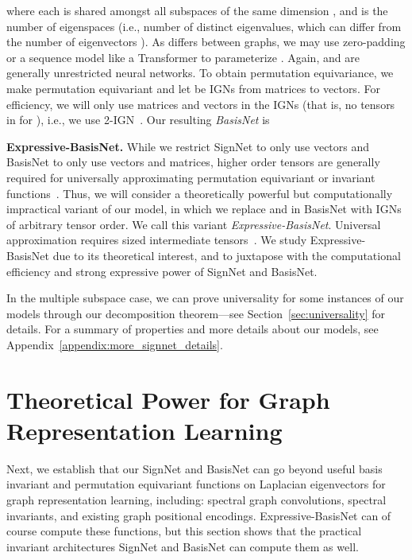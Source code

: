 \documentclass{article} \usepackage{iclr2023_conference,times}
\begin{document}
where each  is shared amongst all subspaces of the same dimension , and  is the number of eigenspaces (i.e., number of distinct eigenvalues, which can differ from the number of eigenvectors ). As  differs between graphs, we may use zero-padding or a sequence model like a Transformer to parameterize . Again,  and  are generally unrestricted neural networks. To obtain permutation equivariance, we make  permutation equivariant and let  be IGNs from matrices to vectors. For efficiency, we will only use matrices and vectors in the IGNs (that is, no tensors in  for ), i.e., we use 2-IGN~\citep{maron2018invariant}. Our resulting \textit{BasisNet} is

\textbf{Expressive-BasisNet.} While we restrict SignNet to only use vectors and BasisNet to only use vectors and matrices,  higher order tensors are generally required for universally approximating permutation equivariant or invariant functions~\citep{keriven2019universal,maron2019universality,maehara2019simple}. Thus, we will consider a theoretically powerful but computationally impractical variant of our model, in which we replace  and  in BasisNet with IGNs of arbitrary tensor order. We call this variant \textit{Expressive-BasisNet}. Universal approximation requires  sized intermediate tensors~\citep{ravanbakhsh2020universal}. 
We study Expressive-BasisNet due to its theoretical interest, and to juxtapose with the computational efficiency and strong expressive power of SignNet and BasisNet.


In the multiple subspace case, we can prove universality for some instances of our models through our decomposition theorem---see Section~\ref{sec:universality} for details. 
For a summary of properties and more details about our models, see Appendix~\ref{appendix:more_signnet_details}.





\section{Theoretical Power for Graph Representation Learning}

Next, we establish that our SignNet and BasisNet can go beyond useful basis invariant and permutation equivariant functions on Laplacian eigenvectors for graph representation learning, including: spectral graph convolutions, spectral invariants, and existing graph positional encodings.  Expressive-BasisNet can of course compute these functions,  but this section shows that the practical invariant architectures SignNet and BasisNet can compute them as well.
\end{document}

